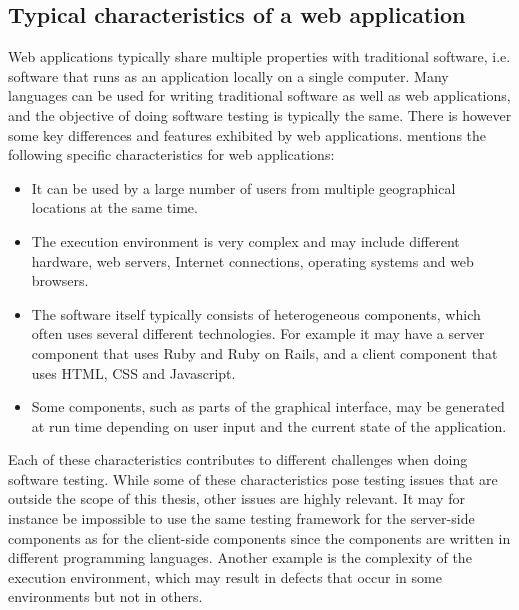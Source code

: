 \MakeShortVerb{\|}

\label{sec:testing_web}

\subsection{Typical characteristics of a web application}

Web applications typically share multiple properties with traditional
software, i.e. software that runs as an application locally on a single
computer. Many languages can be used for writing traditional software as
well as web applications, and the objective of doing software testing is
typically the same. There is however some key differences and features
exhibited by web applications. \citet{book:web} mentions the following
specific characteristics for web applications:\\

\begin{itemize}

\item It can be used by a large number of users from multiple
geographical locations at the same time.

\item The execution environment is very complex and may include
different hardware, web servers, Internet connections, operating systems
and web browsers.

\item The software itself typically consists of heterogeneous
components, which often uses several different technologies. For example
it may have a server component that uses Ruby and Ruby on Rails, and a
client component that uses HTML, CSS and Javascript.

\item Some components, such as parts of the graphical interface, may be
generated at run time depending on user input and the current state of
the application.

\end{itemize}

Each of these characteristics contributes to different challenges when
doing software testing. While some of these characteristics pose testing
issues that are outside the scope of this thesis, other issues are
highly relevant. It may for instance be impossible to use the same
testing framework for the server-side components as for the client-side
components since the components are written in different programming
languages. Another example is the complexity of the execution
environment, which may result in defects that occur in some environments
but not in others.\\


